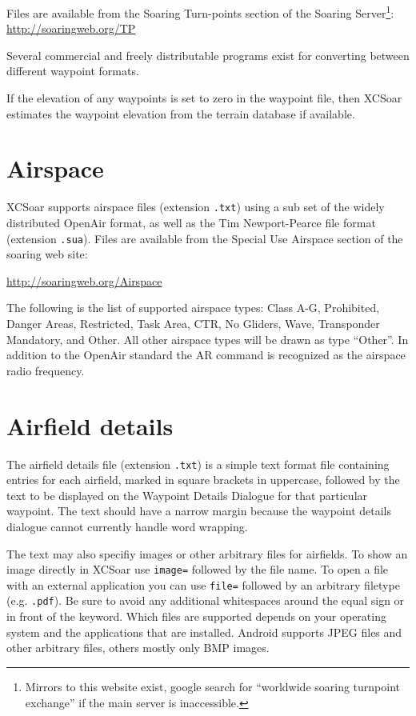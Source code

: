 Files are available from the Soaring Turn-points section of the
Soaring Server\footnote{Mirrors to this website exist, google search
for ``worldwide soaring turnpoint exchange'' if the main server is
inaccessible.}: \url{http://soaringweb.org/TP}

Several commercial and freely distributable programs exist for
converting between different waypoint formats.

If the elevation of any waypoints is set to zero in the waypoint file,
then XCSoar estimates the waypoint elevation from the terrain database
if available.

\section{Airspace}

XCSoar supports airspace files (extension \verb|.txt|) using a sub set
of the widely distributed OpenAir format, as well as the Tim Newport-Pearce file
format (extension \verb|.sua|). Files are available from the
Special Use Airspace section of the soaring web site:

\url{http://soaringweb.org/Airspace}

The following is the list of supported airspace types: Class A-G, Prohibited, 
Danger Areas, Restricted, Task Area, CTR, No Gliders, Wave, Transponder 
Mandatory, and Other.  All other airspace types will be drawn as type ``Other''.
In addition to the OpenAir standard the AR command is recognized as the 
airspace radio frequency.

\section{Airfield details}

The airfield details file (extension \verb|.txt|) is a simple text
format file containing entries for each airfield, marked in square
brackets in uppercase, followed by the text to be displayed on the
Waypoint Details Dialogue for that particular waypoint.  The text should
have a narrow margin because the waypoint details dialogue cannot
currently handle word wrapping.

The text may also specifiy images or other arbitrary files for airfields.  To
show an image directly in XCSoar use \verb|image=| followed by the file
name.  To open a file with an external application you can use
\verb|file=| followed by an arbitrary filetype (e.g. \verb|.pdf|).  Be sure
to avoid any additional whitespaces around the equal sign or in front of the
keyword. Which files are supported depends on your operating system and the
applications that are installed.  Android supports JPEG files and other
arbitrary files, others mostly only BMP images.

